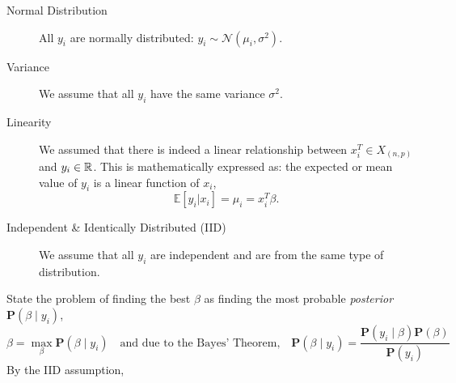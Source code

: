 \documentclass{homework}
\renewcommand\P{\mathbf{P}}
\begin{document}
\begin{description}
  \item[Normal Distribution] All $y_i$ are normally distributed:
    $y_i \sim \mathcal{N}(\mu_i, \sigma^2)$.
  \item[Variance] We assume that all $y_i$ have the same variance $\sigma^2$.
  \item[Linearity] We assumed that there is indeed a linear
    relationship between $x_i^T \in X_{(n, p)}$ and $y_i \in \mathbb{R}$. This
    is mathematically expressed as: the expected or mean value of
    $y_i$ is a linear function of $x_i$,
    \[
      \mathbb{E}[y_i|x_i] = \mu_i = x_{i}^{T}\beta.
    \]
  \item[Independent \& Identically Distributed (IID)] We assume that
    all $y_i$ are independent and are from the same type of
    distribution.
\end{description}
State the problem of finding the best $\beta$ as finding the most
probable \textit{posterior} $\P(\beta \mid y_i)$,
\[
  \beta = \max_\beta \P(\beta \mid y_i)
  \quad\text{and due to the Bayes' Theorem,}\quad
  \P(\beta \mid y_i) =  \frac{\P(y_i\mid \beta)\P(\beta)}{\P(y_i)}
\]
By the IID assumption,
\end{document}
